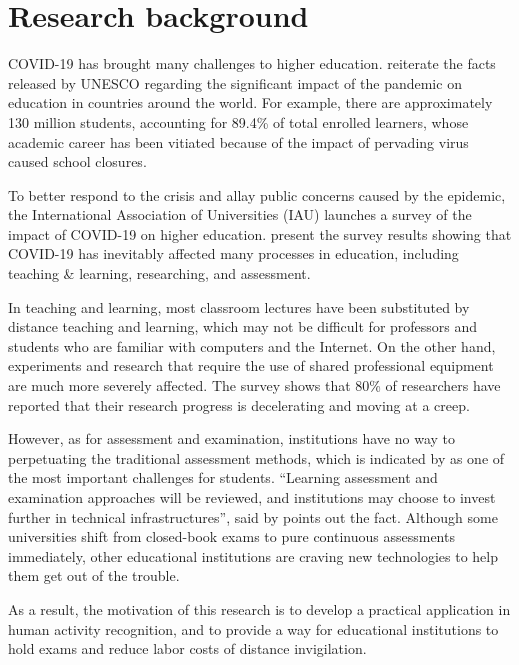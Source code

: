 \section{Research background}
\label{sec:Research background}
COVID-19 has brought many challenges to higher education.
\citet{marinoni2020impact} reiterate the facts released by UNESCO regarding the significant impact of the pandemic on education in countries around the world.
For example, there are approximately 130 million students, accounting for 89.4\% of total enrolled learners, whose academic career has been vitiated because of the impact of pervading virus caused school closures.

To better respond to the crisis and allay public concerns caused by the epidemic, the International Association of Universities (IAU) launches a survey of the impact of COVID-19 on higher education.
\citet{marinoni2020impact} present the survey results showing that COVID-19 has inevitably affected many processes in education, including teaching \& learning, researching, and assessment.

In teaching and learning, most classroom lectures have been substituted by distance teaching and learning, which may not be difficult for professors and students who are familiar with computers and the Internet.
On the other hand, experiments and research that require the use of shared professional equipment are much more severely affected.
The survey shows that 80\% of researchers have reported that their research progress is decelerating and moving at a creep.

However, as for assessment and examination, institutions have no way to perpetuating the traditional assessment methods, which is indicated by \citet{clark2020testing} as one of the most important challenges for students.
``Learning assessment and examination approaches will be reviewed, and institutions may choose to invest further in technical infrastructures'', said by \citet{marinoni2020impact} points out the fact.
Although some universities shift from closed-book exams to pure continuous assessments immediately, other educational institutions are craving new technologies to help them get out of the trouble.

As a result, the motivation of this research is to develop a practical application in human activity recognition, and to provide a way for educational institutions to hold exams and reduce labor costs of distance invigilation.

